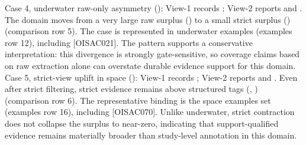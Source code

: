 {}Case 4, underwater raw-only asymmetry (): View-1 records ; View-2 reports  and . The domain moves from a very large raw surplus () to a small strict surplus () (comparison row \markdownRendererHash{}5). The case is represented in underwater  examples (examples row \markdownRendererHash{}12), including  [O\markdownRendererUnderscore{}ISAC\markdownRendererUnderscore{}021]. The pattern supports a conservative interpretation: this divergence is strongly gate-sensitive, so coverage claims based on raw extraction alone can overstate durable evidence support for this domain.\markdownRendererParagraphSeparator
{}Case 5, strict-view uplift in space (): View-1 records ; View-2 reports  and . Even after strict filtering, strict evidence remains above structured tags (, ) (comparison row \markdownRendererHash{}6). The representative binding is the space  examples set (examples row \markdownRendererHash{}16), including  [O\markdownRendererUnderscore{}ISAC\markdownRendererUnderscore{}070]. Unlike underwater, strict contraction does not collapse the surplus to near-zero, indicating that support-qualified evidence remains materially broader than study-level annotation in this domain.\markdownRendererParagraphSeparator
